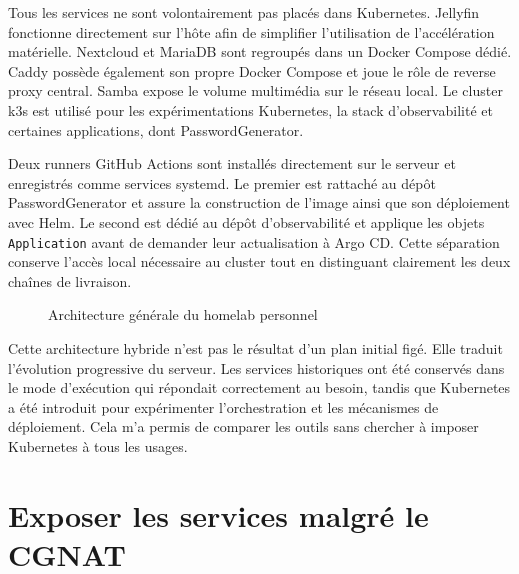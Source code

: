 Tous les services ne sont volontairement pas placés dans Kubernetes. Jellyfin fonctionne directement sur l'hôte afin de simplifier l'utilisation de l'accélération matérielle. Nextcloud et MariaDB sont regroupés dans un Docker Compose dédié. Caddy possède également son propre Docker Compose et joue le rôle de reverse proxy central. Samba expose le volume multimédia sur le réseau local. Le cluster k3s est utilisé pour les expérimentations Kubernetes, la stack d'observabilité et certaines applications, dont PasswordGenerator.

Deux runners GitHub Actions sont installés directement sur le serveur et enregistrés comme services systemd. Le premier est rattaché au dépôt PasswordGenerator et assure la construction de l'image ainsi que son déploiement avec Helm. Le second est dédié au dépôt d'observabilité et applique les objets \texttt{Application} avant de demander leur actualisation à Argo CD. Cette séparation conserve l'accès local nécessaire au cluster tout en distinguant clairement les deux chaînes de livraison.

\begin{figure}[H]
\centering
{}
\caption{Architecture générale du homelab personnel}
\label{fig:homelab-architecture}
\end{figure}

Cette architecture hybride n'est pas le résultat d'un plan initial figé. Elle traduit l'évolution progressive du serveur. Les services historiques ont été conservés dans le mode d'exécution qui répondait correctement au besoin, tandis que Kubernetes a été introduit pour expérimenter l'orchestration et les mécanismes de déploiement. Cela m'a permis de comparer les outils sans chercher à imposer Kubernetes à tous les usages.

\section{Exposer les services malgré le CGNAT}

